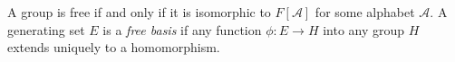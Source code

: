 A group is free if and only if it is isomorphic to $F[\mathcal{A}]$ for some alphabet $\mathcal{A}$. A generating set $E$ is a \textit{free basis} if any function $\phi: E \to H$ into any group $H$ extends uniquely to a homomorphism.

